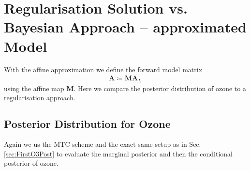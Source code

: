 \clearpage
\section{Regularisation Solution vs. Bayesian Approach -- approximated Model}
\label{sec:ComparReg}%
With the affine approximation we define the forward model matrix
\begin{align}
	\bm{A}  \coloneqq \bm{M A}_L \,
\end{align}
using the affine map $\bm{M}$.
Here we compare the posterior distribution of ozone to a regularisation approach.

\subsection{Posterior Distribution for Ozone}
Again we us the MTC scheme and the exact same setup as in Sec. \ref{sec:FirstO3Post} to evaluate the marginal posterior and then the conditional posterior of ozone.

